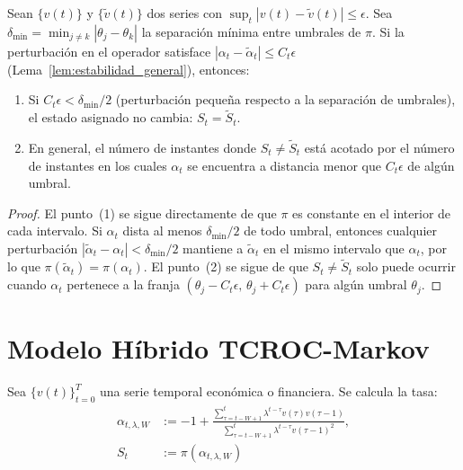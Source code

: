 \begin{lemma}
\label{lem:estabilidad_discreta}
Sean $\{v(t)\}$ y $\{\tilde{v}(t)\}$ dos series con
$\sup_t |v(t) - \tilde{v}(t)| \leq \epsilon$.  Sea
$\delta_{\min} = \min_{j \neq k} |\theta_j - \theta_k|$ la
separación mínima entre umbrales de $\pi$.  Si la perturbación
en el operador satisface $|\alpha_t - \tilde{\alpha}_t|
\leq C_t \epsilon$ (Lema~\ref{lem:estabilidad_general}), entonces:
\begin{enumerate}
  \item Si $C_t \epsilon < \delta_{\min}/2$
        (perturbación pequeña respecto a la separación de
        umbrales), el estado asignado no cambia:
        $S_t = \tilde{S}_t$.
  \item En general, el número de instantes donde
        $S_t \neq \tilde{S}_t$ está acotado por el número de
        instantes en los cuales $\alpha_t$ se encuentra a
        distancia menor que $C_t \epsilon$ de algún umbral.
\end{enumerate}
\end{lemma}

\begin{proof}
El punto~(1) se sigue directamente de que $\pi$ es constante en
el interior de cada intervalo.  Si $\alpha_t$ dista al menos
$\delta_{\min}/2$ de todo umbral, entonces cualquier perturbación
$|\tilde{\alpha}_t - \alpha_t| < \delta_{\min}/2$ mantiene a
$\tilde{\alpha}_t$ en el mismo intervalo que $\alpha_t$, por lo que
$\pi(\tilde{\alpha}_t) = \pi(\alpha_t)$.  El punto~(2) se sigue de
que $S_t \neq \tilde{S}_t$ solo puede ocurrir cuando $\alpha_t$
pertenece a la franja $(\theta_j - C_t\epsilon,\,
\theta_j + C_t\epsilon)$ para algún umbral $\theta_j$.
\end{proof}

\section{Modelo Híbrido TCROC-Markov}
\label{sec:modelo_hibrido_tcroc_markov}

Sea $\{v(t)\}_{t=0}^T$ una serie temporal económica o financiera.
Se calcula la tasa:
\begin{align}
\alpha_{t,\lambda,W} &:= -1 + \frac{\sum_{\tau=t-W+1}^{t}
  \lambda^{t-\tau} v(\tau) v(\tau-1)}{\sum_{\tau=t-W+1}^{t}
  \lambda^{t-\tau} v(\tau-1)^2},
  \label{eq:tcroc_markov_alpha} \\
S_t &:= \pi(\alpha_{t,\lambda,W}) \label{eq:state_assignment}
\end{align}

